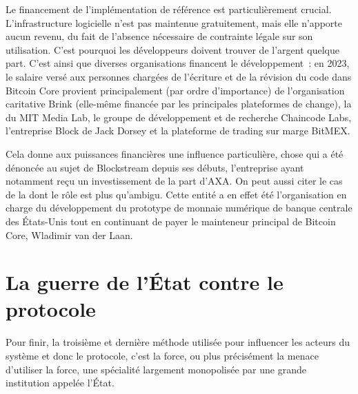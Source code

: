Le financement de l'implémentation de référence est particulièrement crucial. L'infrastructure logicielle n'est pas maintenue gratuitement, mais elle n'apporte aucun revenu, du fait de l'absence nécessaire de contrainte légale sur son utilisation. C'est pourquoi les développeurs doivent trouver de l'argent quelque part. C'est ainsi que diverses organisations financent le développement~: en 2023, le salaire versé aux personnes chargées de l'écriture et de la révision du code dans Bitcoin Core provient principalement (par ordre d'importance) de l'organisation caritative Brink (elle-même financée par les principales plateformes de change), la  du MIT Media Lab, le groupe de développement et de recherche Chaincode Labs, l'entreprise Block de Jack Dorsey et la plateforme de trading sur marge BitMEX.

Cela donne aux puissances financières une influence particulière, chose qui a été dénoncée au sujet de Blockstream depuis ses débuts, l'entreprise ayant notamment reçu un investissement de la part d'AXA. On peut aussi citer le cas de la  dont le rôle est plus qu'ambigu. Cette entité a en effet été l'organisation en charge du développement du prototype de monnaie numérique de banque centrale des États-Unis tout en continuant de payer le mainteneur principal de Bitcoin Core, Wladimir van der Laan.

\section*{La guerre de l'État contre le protocole} %

Pour finir, la troisième et dernière méthode utilisée pour influencer les acteurs du système et donc le protocole, c'est la force, ou plus précisément la menace d'utiliser la force, une spécialité largement monopolisée par une grande institution appelée l'État.

